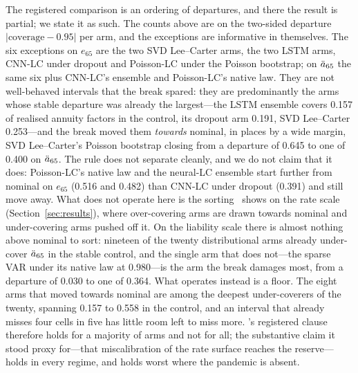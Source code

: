 The registered comparison is an ordering of departures, and there the
result is partial; we state it as such. The counts above are on the
two-sided departure $|\text{coverage}-0.95|$ per arm, and the exceptions
are informative in themselves. The six exceptions on $e_{65}$ are the two
SVD Lee--Carter arms, the two LSTM arms, CNN-LC under dropout and
Poisson-LC under the Poisson bootstrap; on $\ddot{a}_{65}$ the same six plus
CNN-LC's ensemble and Poisson-LC's native law. They are not well-behaved
intervals that the break spared: they are predominantly the arms whose
stable departure was already the largest---the LSTM ensemble covers 0.157
of realised annuity factors in the control, its dropout arm 0.191, SVD
Lee--Carter 0.253---and the break moved them \emph{towards} nominal, in
places by a wide margin, SVD Lee--Carter's Poisson bootstrap closing from a
departure of 0.645 to one of 0.400 on $\ddot{a}_{65}$. The rule does not
separate cleanly, and we do not claim that it does: Poisson-LC's native law
and the neural-LC ensemble start further from nominal on $e_{65}$ (0.516
and 0.482) than CNN-LC under dropout (0.391) and still move away. What does
not operate here is the sorting \Htwo\ shows on the rate scale
(Section~\ref{sec:results}), where over-covering arms are drawn towards
nominal and under-covering arms pushed off it. On the liability scale there
is almost nothing above nominal to sort: nineteen of the twenty
distributional arms already under-cover $\ddot{a}_{65}$ in the stable control,
and the single arm that does not---the sparse VAR under its native law at
0.980---is the arm the break damages most, from a departure of 0.030 to one
of 0.364. What operates instead is a floor. The eight arms that moved
towards nominal are among the deepest under-coverers of the twenty,
spanning 0.157 to 0.558 in the control, and an interval that already misses
four cells in five has little room left to miss more. \Hfive's registered
clause therefore holds for a majority of arms and not for all; the
substantive claim it stood proxy for---that miscalibration of the rate
surface reaches the reserve---holds in every regime, and holds worst where
the pandemic is absent.

